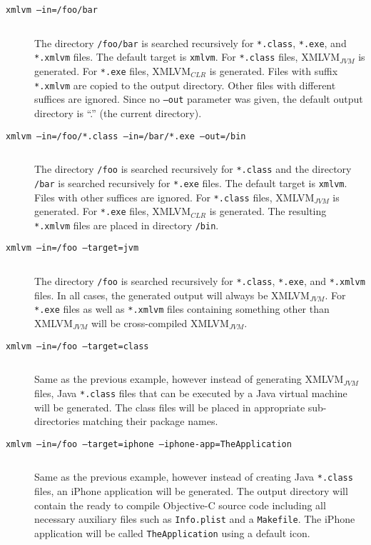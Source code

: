\documentclass[12pt]{article}
\begin{document}
\begin{description}

\item[\texttt{xmlvm --in=/foo/bar}] $ $

  The directory \texttt{/foo/bar} is searched recursively for
  \texttt{*.class}, \texttt{*.exe}, and \texttt{*.xmlvm} files. The
  default target is \texttt{xmlvm}. For \texttt{*.class} files,
  XMLVM$_{JVM}$ is generated. For \texttt{*.exe} files, XMLVM$_{CLR}$
  is generated. Files with suffix \texttt{*.xmlvm} are copied to the
  output directory. Other files with different suffices are ignored.
  Since no \texttt{--out} parameter was given, the default output
  directory is ``.'' (the current directory).

\item[\texttt{xmlvm --in=/foo/*.class --in=/bar/*.exe --out=/bin}] $ $

  The directory \texttt{/foo} is searched recursively for
  \texttt{*.class} and the directory \texttt{/bar} is searched
  recursively for \texttt{*.exe} files. The default target is
  \texttt{xmlvm}. Files with other suffices are ignored. For
  \texttt{*.class} files, XMLVM$_{JVM}$ is generated. For
  \texttt{*.exe} files, XMLVM$_{CLR}$ is generated. The resulting
  \texttt{*.xmlvm} files are placed in directory \texttt{/bin}.

\item[\texttt{xmlvm --in=/foo --target=jvm}] $ $

  The directory \texttt{/foo} is searched recursively for
  \texttt{*.class}, \texttt{*.exe}, and \texttt{*.xmlvm} files. In all
  cases, the generated output will always be XMLVM$_{JVM}$. For
  \texttt{*.exe} files as well as \texttt{*.xmlvm} files containing
  something other than XMLVM$_{JVM}$ will be cross-compiled
  XMLVM$_{JVM}$.

\item[\texttt{xmlvm --in=/foo --target=class}] $ $

  Same as the previous example, however instead of generating
  XMLVM$_{JVM}$ files, Java \texttt{*.class} files that can be
  executed by a Java virtual machine will be generated. The class
  files will be placed in appropriate sub-directories matching their
  package names.

\item[\texttt{xmlvm --in=/foo --target=iphone --iphone-app=TheApplication}] $ $

  Same as the previous example, however instead of creating Java
  \texttt{*.class} files, an iPhone application will be generated.
  The output directory will contain the ready to compile Objective-C
  source code including all necessary auxiliary files such as
  \texttt{Info.plist} and a \texttt{Makefile}. The iPhone application
  will be called \texttt{TheApplication} using a default icon.


\end{description}
\end{document}

